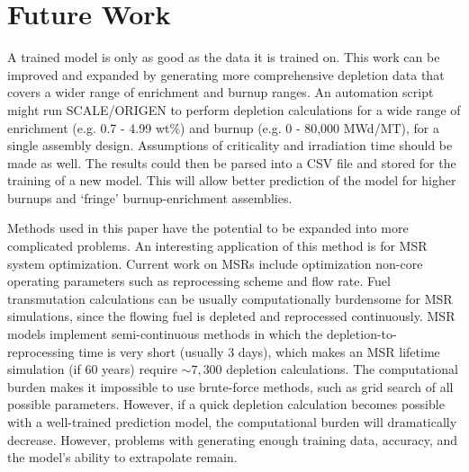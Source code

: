 \section{Future Work}

A trained model is only as good as the data it is trained on.
This work can be improved and expanded by generating
more comprehensive depletion data that covers a wider
range of enrichment and burnup ranges. An automation
script might run SCALE/ORIGEN to perform depletion calculations
for a wide range of enrichment (e.g. 0.7 - 4.99 wt\%) and burnup (e.g. 0 - 80,000 MWd/MT),
for a single assembly design. Assumptions of criticality
and irradiation time should be made as well. The results
could then be parsed into a \gls{CSV} file and stored for
the training of a new model. This will allow better
prediction of the model for higher burnups and `fringe'
burnup-enrichment assemblies.

Methods used in this paper have the potential to be expanded into more
complicated problems. An interesting application of this method is for
\gls{MSR} system optimization. Current work on
\glspl{MSR} include optimization non-core operating
parameters such as reprocessing scheme and flow rate.
Fuel transmutation calculations
can be usually computationally burdensome for \gls{MSR}
simulations, since the flowing fuel is depleted and
reprocessed continuously. \gls{MSR} models implement semi-continuous
methods in which the depletion-to-reprocessing time is
very short (usually 3 days), which makes an
\gls{MSR} lifetime simulation (if 60 years)
require $\sim 7,300$ depletion calculations.
The computational burden
makes it impossible to use brute-force methods,
such as grid search of all possible parameters.
However, if a quick depletion calculation becomes possible
with a well-trained prediction model, the
computational burden will dramatically decrease.
However, problems with generating enough
training data, accuracy, and the model's ability to
extrapolate remain.